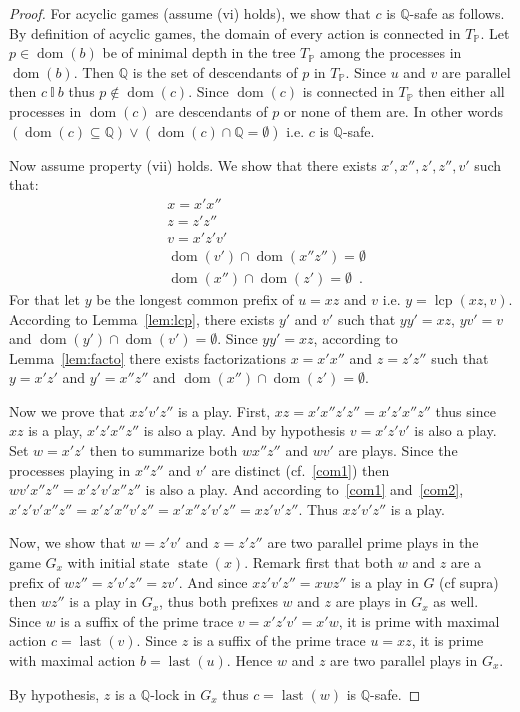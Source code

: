 \documentclass[a4paper,UKenglish]{lipics-v2016}
\newcommand{\PP}{\mathbb{P}}
\newcommand{\QQ}{\mathbb{Q}}
\newcommand{\ind}{~\mathbb{I}~}
\DeclareMathOperator{\dom}{dom}
\DeclareMathOperator{\last}{last}
\DeclareMathOperator{\state}{state}
\DeclareMathOperator{\lcp}{lcp}
\begin{document}
\begin{proof}
\medskip

For acyclic games (assume (vi) holds), we show that $c$ is $\QQ$-safe as follows.
By definition of acyclic games,
the domain of every action is connected in $T_\PP$.
Let $p \in \dom(b)$ be of minimal depth in the tree
$T_\PP$ among the processes in $\dom(b)$.
Then  $\QQ$ is the set of descendants of $p$ in $T_\PP$.
Since $u$ and $v$ are parallel then $c \ind b$
thus $p\not \in \dom(c)$.
Since $\dom(c)$ is connected in $T_\PP$ then either all processes in $\dom(c)$ are descendants of $p$ or none of them are.
In other words $(\dom(c) \subseteq \QQ) \lor (\dom(c) \cap  \QQ =  \emptyset)$ i.e. $c$ is $\QQ$-safe.

\medskip

Now assume property (vii) holds.
We show that there exists $x',x'',z',z'',v'$ such that:
\begin{align}
& x = x'x''\\
& z = z'z''\\
& v = x'z' v'\\
\label{com1}& \dom(v') \cap \dom(x''z'') = \emptyset\\
\label{com2}&\dom(x'') \cap \dom(z') = \emptyset\enspace.
\end{align}
For that let $y$ be the longest common prefix of $u=xz$ and $v$ i.e. $y=\lcp(xz,v)$.
According to Lemma~\ref{lem:lcp},
there exists $y'$ and $v'$ such that
$yy'=xz$, $yv'=v$
and  $\dom(y')\cap \dom(v')= \emptyset$.
Since $yy'=xz$,
according to Lemma~\ref{lem:facto}
 there exists factorizations
$x=x'x''$ and $z=z'z''$ such that
$y=x'z'$ and $y'=x''z''$
and
$\dom(x'') \cap \dom(z') = \emptyset$.

Now we prove that $xz'v'z''$ is a play.
First, $xz=x'x''z'z''=x'z'x''z''$ thus since $xz$ is a play,
$x'z'x''z''$ is also a play.
And by hypothesis $v=x'z'v'$ is also a play.
Set $w=x'z'$ then to summarize both $wx''z''$ and $wv'$ are plays.
Since the processes playing in $x''z''$ and $v'$ are distinct
(cf.~\eqref{com1})
then $wv'x''z''=x'z'v'x''z''$ is also a play.
And according to~\eqref{com1} and~\eqref{com2},
$x'z'v'x''z''=x'z'x''v'z''=x'x''z'v'z''=xz'v'z''$.
Thus $xz'v'z''$ is a play.

Now, we show that $w=z'v'$ and $z=z'z''$
are two parallel prime plays in the game
$G_x$ with initial state $\state(x)$.
Remark first that both $w$ and $z$ are a prefix 
of $wz''=z'v'z''=zv'$.
And since $xz'v'z''=xwz''$ is a play in $G$ (cf supra)
then $wz''$ is a play in $G_x$,
thus both prefixes $w$ and $z$ are plays in $G_x$ as well.
Since $w$ is a suffix of the prime trace $v=x'z'v'=x'w$, it is prime with maximal action $c=\last(v)$.
Since $z$ is a suffix of the prime trace $u=xz$,
it is prime with maximal action $b=\last(u)$.
Hence $w$ and $z$ are two parallel plays in $G_x$.

By hypothesis, $z$ is a $\QQ$-lock in $G_x$
thus $c=\last(w)$ is $\QQ$-safe.
\end{proof}
\end{document}
